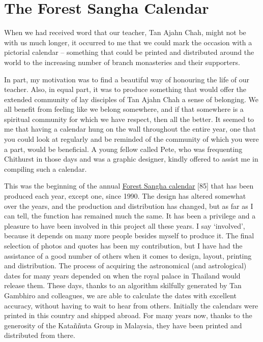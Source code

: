 \chapter{The Forest Sangha Calendar}

When we had received word that our teacher, Tan Ajahn Chah, might not be
with us much longer, it occurred to me that we could mark the occasion
with a pictorial calendar -- something that could be printed and
distributed around the world to the increasing number of branch
monasteries and their supporters.

In part, my motivation was to find a beautiful way of honouring the life
of our teacher. Also, in equal part, it was to produce something that
would offer the extended community of lay disciples of Tan Ajahn Chah a
sense of belonging. We all benefit from feeling like we belong
somewhere, and if that somewhere is a spiritual community for which we
have respect, then all the better. It seemed to me that having a
calendar hung on the wall throughout the entire year, one that you could
look at regularly and be reminded of the community of which you were a
part, would be beneficial. A young fellow called Pete, who was
frequenting Chithurst in those days and was a graphic designer, kindly
offered to assist me in compiling such a calendar.

This was the beginning of the annual
\href{https://forestsangha.org/community/calendars/printed}{\underline{Forest
Sangha calendar}} {[}85{]} that has been produced each year, except one,
since 1990. The design has altered somewhat over the years, and the
production and distribution has changed, but as far as I can tell, the
function has remained much the same. It has been a privilege and a
pleasure to have been involved in this project all these years. I say
`involved', because it depends on many more people besides myself to
produce it. The final selection of photos and quotes has been my
contribution, but I have had the assistance of a good number of others
when it comes to design, layout, printing and distribution. The process
of acquiring the astronomical (and astrological) dates for many years
depended on when the royal palace in Thailand would release them. These
days, thanks to an algorithm skilfully generated by Tan Gambhiro and
colleagues, we are able to calculate the dates with excellent accuracy,
without having to wait to hear from others. Initially the calendars were
printed in this country and shipped abroad. For many years now, thanks
to the generosity of the Kataññuta Group in Malaysia, they have been
printed and distributed from there.


